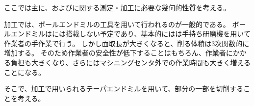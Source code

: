 

ここでは主に、\textbf{\EndFaceOutRoundChamfer}および\textbf{\EndFaceInRoundChamfer}に関する測定・加工に必要な幾何的性質を考える。

\nameEndFaceRoundChamfer 加工では、ボールエンドミルの工具を用いて行われるのが一般的である。
ボールエンドミルは\DMC には搭載しない予定であり、基本的には\EndFaceRoundChamfer は手持ち研磨機を用いて作業者の手作業で行う。
しかし面取長が大きくなると、削る体積は3次関数的に増加する。
そのため作業者の安全性が低下することはもちろん、作業者にかかる負担も大きくなり、さらにはマシニングセンタ外での作業時間も大きく増えることになる。

そこで、\nameEndFaceChamfer 加工で用いられるテーパエンドミルを用いて、\EndFaceRoundChamfer 部分の一部を切削することを考える。



